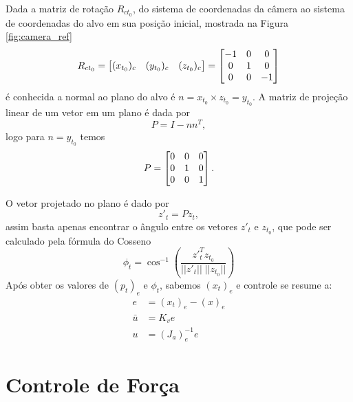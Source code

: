 Dada a matriz de rotação ${R}_{ct_0}$, do sistema de coordenadas da câmera ao sistema de coordenadas do alvo em sua posição inicial, mostrada na Figura \ref{fig:camera_ref}
\begin{equation}
{R}_{ct_0} = \begin{bmatrix} ({x}_{t_0})_c & ({y}_{t_0})_c  & ({z}_{t_0})_c\end{bmatrix} = 
\begin{bmatrix}
	-1 & 0 & 0 \\
	0 & 1 & 0 \\
	0 & 0 & -1
\end{bmatrix}
\end{equation}
é conhecida a normal ao plano do alvo é ${n} = {x}_{t_0} \times {z}_{t_0} =  {y}_{t_0} $. A matriz de projeção linear \citep{strang} de um vetor em um plano é dada por
\begin{equation}
{P} = {I} - {n} {n}^T,
\end{equation}
logo para ${n} = {y}_{t_0}$ temos 
\begin{equation}
{P} =  \begin{bmatrix}
	 0  &   0  &   0 \\
     0  &   1  &   0 \\
     0  &   0  &   1
\end{bmatrix}.
\end{equation}

O vetor projetado no plano é dado por
\begin{equation}
{z'}_{t} = {P} {z}_{t},
\end{equation}
assim basta apenas encontrar o ângulo entre os vetores ${z'}_{t}$ e ${z}_{t_0}$, que pode ser calculado pela fórmula do Cosseno \citep{strang} 
\begin{equation}
\phi_t = \cos^{-1} \left( \frac{{z'}^T_{t} {z}_{t_0} } {||{z'}_{t}|| \; ||{z}_{t_0}||} \right)
\end{equation}
Após obter os valores de $(p_t)_e$ e $\phi_t$, sabemos $(x_t)_e$ e controle se resume a:
\begin{align}
{e} &= ({x}_t)_e - ({x})_e \\
{\bar{u}} &= {K}_v {e}  \\
{u} &= ({J}_{a})_e^{-1} {e}
\end{align}

\section{Controle de Força} \label{sec:force}

